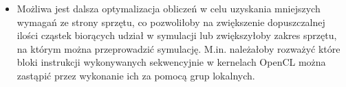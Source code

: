 \documentclass[polish, 12pt]{aghthesis}
\begin{document}
\begin{itemize}
			\item Możliwa jest dalsza optymalizacja obliczeń w celu uzyskania mniejszych wymagań ze strony sprzętu, co pozwoliłoby na zwiększenie dopuszczalnej ilości cząstek biorących udział w symulacji lub zwiększyłoby zakres sprzętu, na którym można przeprowadzić symulację. M.in. należałoby rozważyć które bloki instrukcji wykonywanych sekwencyjnie w kernelach OpenCL można zastąpić przez wykonanie ich za pomocą grup lokalnych.
		\end{itemize}

\nocite{OpenCLProgrammingGuide, GameCodingComplete, CLPP, SPHWebinar, Lucy, MonLat, Boryczko, Lombardi}

\end{document}
